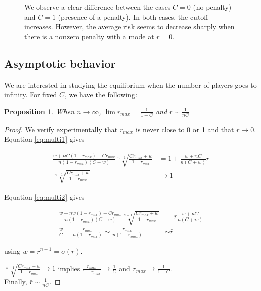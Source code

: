 \documentclass[preprint,12pt,authoryear,doubleblind]{elsarticle}
\newtheorem{proposition}[theorem]{Proposition}
\theoremstyle{definition}
\begin{document}
\begin{figure}[htbp]
  \centering
  \begin{minipage}[t]{0.48\textwidth}
    \centering
    
  \end{minipage}
  \hfill
  \begin{minipage}[t]{0.48\textwidth}
    \centering
    
  \end{minipage}
  \caption{We observe a clear difference between the cases $C=0$ (no penalty) and $C=1$ (presence of a penalty). In both cases, the cutoff increases. However, the average risk seems to decrease sharply when there is a nonzero penalty with a mode at $r=0$.}
  \label{fig:solution-multiple}  
\end{figure}

\subsection{Asymptotic behavior}

We are interested in studying the equilibrium when the number of players goes to infinity. For fixed $C$, we have the following:

\begin{proposition}When $n\rightarrow \infty$,
    $\lim {r_{max}} = \frac{1}{1+C}$ and $\bar r \sim \frac{1}{n C}$
\end{proposition}


\begin{proof}
We verify experimentally that $r_{max}$ is never close to 0 or 1 and that $\bar r \rightarrow 0$.
Equation \ref{eq:multi1} gives

\begin{align*}
    \frac{w + n C (1-{r_{max}}) + C {r_{max}}}{n (1-{r_{max}})(C+w)} \sqrt[n-1]{\frac{C{r_{max}}+w}{1-{r_{max}}}} &= 1 + \frac{w + nC}{n(C+w)} \bar r \\
    \sqrt[n-1]{\frac{C{r_{max}}+w}{1-{r_{max}}}} &\rightarrow 1
\end{align*}

Equation \ref{eq:multi2} gives

\begin{align*}
    \frac{w - nw(1-{r_{max}})+C{r_{max}}}{n(1-{r_{max}})(C+w)} \sqrt[n-1]{\frac{C{r_{max}}+w}{1-{r_{max}}}} &= \bar r \frac{w + nC}{n(C+w)} \\
    \frac{w}{C} + \frac{{r_{max}}}{n(1-{r_{max}})} \sim \frac{{r_{max}}}{n(1-{r_{max}})}  &\sim \bar r
\end{align*}


using $w = \bar r ^{n-1} = o(\bar r)$.

$\sqrt[n-1]{\frac{C{r_{max}}+w}{1-{r_{max}}}} \rightarrow 1$ implies $\frac{{r_{max}}}{1-{r_{max}}} \rightarrow \frac{1}C$ and ${r_{max}} \rightarrow \frac{1}{1+C}$.\\Finally, $\bar r \sim \frac{1}{nC}$.
\end{proof}
\end{document}
